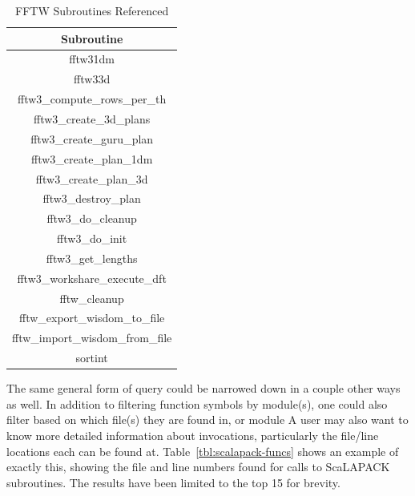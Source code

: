 \begin{table}[htbp]
\caption{FFTW Subroutines Referenced}
\begin{center}
\begin{tabular}{|c|}
\hline
\textbf{Subroutine} \\
\hline
fftw31dm \\
\hline
fftw33d \\
\hline
fftw3\_compute\_rows\_per\_th \\
\hline
fftw3\_create\_3d\_plans \\
\hline
fftw3\_create\_guru\_plan \\
\hline
fftw3\_create\_plan\_1dm \\
\hline
fftw3\_create\_plan\_3d \\
\hline
fftw3\_destroy\_plan \\
\hline
fftw3\_do\_cleanup \\
\hline
fftw3\_do\_init \\
\hline
fftw3\_get\_lengths \\
\hline
fftw3\_workshare\_execute\_dft \\
\hline
fftw\_cleanup \\
\hline
fftw\_export\_wisdom\_to\_file \\
\hline
fftw\_import\_wisdom\_from\_file \\
\hline
sortint \\
\hline
\end{tabular}
\label{tab:fftw-funcs}
\end{center}
\end{table}

The same general form of query could be narrowed down in a couple other ways as well.
In addition to filtering function symbols by module(s), one could also filter based on which file(s) they 
are found in, or module
A user may also want to know more detailed information about invocations, particularly the file/line 
locations each can be found at.
Table~\ref{tbl:scalapack-funcs} shows an example of exactly this, showing the file and line numbers 
found for calls to ScaLAPACK subroutines.
The results have been limited to the top 15 for brevity.

